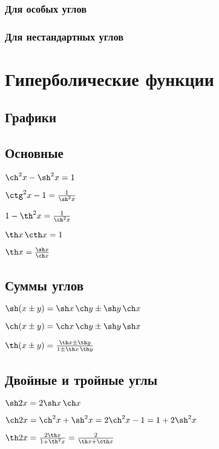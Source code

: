 \subsubsection{Для особых углов}

\subsubsection{Для нестандартных углов}


\section{Гиперболические функции}

\subsection{Графики}

\subsection{Основные}

$ \ch^2 x - \sh^2 x = 1 $

$ \ctg^2 x - 1 = \frac{1}{\sh^2 x} $

$ 1 - \th^2 x = \frac{1}{\ch^2 x} $

$ \th x \, \cth x = 1 $

$ \th x = \frac{\sh x}{\ch x} $

\subsection{Суммы углов}

$ \sh(x \pm y) = \sh x \, \ch y \pm \sh y \, \ch x $

$ \ch(x \pm y) = \ch x \, \ch y \pm \sh y \, \sh x $

$ \th(x \pm y) = \frac{\th x \pm \th y}{1 \pm \th x \, \th y} $

\subsection{Двойные и тройные углы}

$ \sh 2x = 2\sh x \, \ch x $

$ \ch 2x = \ch^2 x + \sh^2 x = 2\ch^2 x - 1 = 1 + 2\sh^2 x $

$ \th 2x = \frac{2\th x}{1 + \th^2 x} = \frac{2}{\th x + \cth x} $

